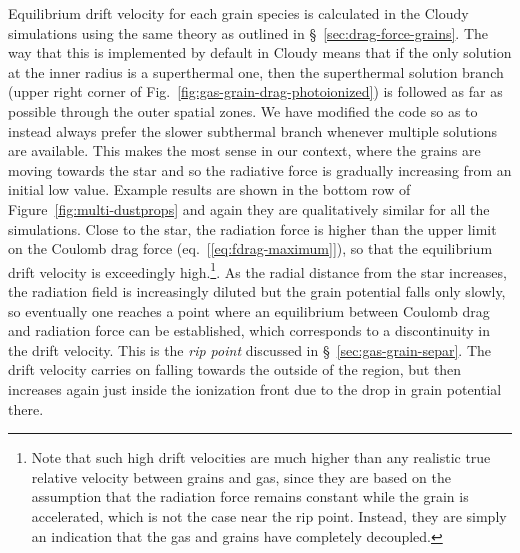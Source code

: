 Equilibrium drift velocity for each grain species is calculated in the
Cloudy simulations using the same theory \citep{Draine:1979a} as
outlined in \S~\ref{sec:drag-force-grains}.  The way that this is
implemented by default in Cloudy means that if the only solution at
the inner radius is a superthermal one, then the superthermal solution
branch (upper right corner of
Fig.~\ref{fig:gas-grain-drag-photoionized}) is followed as far as
possible through the outer spatial zones.  We have modified the code
so as to instead always prefer the slower subthermal branch whenever
multiple solutions are available.  This makes the most sense in our
context, where the grains are moving towards the star and so the
radiative force is gradually increasing from an initial low value.
Example results are shown in the bottom row of
Figure~\ref{fig:multi-dustprops} and again they are qualitatively
similar for all the simulations.  Close to the star, the radiation
force is higher than the upper limit on the Coulomb drag force
(eq.~[\ref{eq:fdrag-maximum}]), so that the equilibrium drift velocity
is exceedingly high.\footnote{Note that such high drift velocities are
  much higher than any realistic true relative velocity between grains
  and gas, since they are based on the assumption that the radiation
  force remains constant while the grain is accelerated, which is not
  the case near the rip point.  Instead, they are simply an indication
  that the gas and grains have completely decoupled.}.  As the radial
distance from the star increases, the radiation field is increasingly
diluted but the grain potential falls only slowly, so eventually one
reaches a point where an equilibrium between Coulomb drag and
radiation force can be established, which corresponds to a
discontinuity in the drift velocity.  This is the \textit{rip point}
discussed in \S~\ref{sec:gas-grain-separ}.  The drift velocity carries
on falling towards the outside of the \hii{} region, but then
increases again just inside the ionization front due to the drop in
grain potential there.

